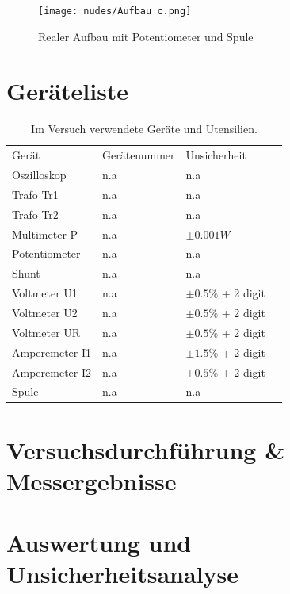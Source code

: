 \documentclass[12pt,a4paper,twoside]{article}
\begin{document}
\begin{figure}[H]
    \centering
    \texttt{[image: nudes/Aufbau c.png]}
    \caption{Realer Aufbau mit Potentiometer und Spule}
    \label{fig:RealerAufbauB}
\end{figure}



\section{Geräteliste} %

    \begin{table}[H]
        \centering
        \caption{Im Versuch verwendete Geräte und Utensilien.}
        \label{tab:geraete}
        \begin{tabular}{| l | l | l | l |}
            \hline
            Gerät & Gerätenummer  & Unsicherheit \\
            Oszilloskop & {n.a} & {n.a} \\
            Trafo Tr1 & {n.a} & {n.a} \\
            Trafo Tr2 & {n.a} & {n.a} \\
            Multimeter P & {n.a} & $\pm 0.001 W$ \\
            Potentiometer & {n.a} & {n.a} \\
            Shunt & {n.a} & {n.a} \\
            Voltmeter U1 & {n.a} & $\pm 0.5\%$ + 2 digit \\
            Voltmeter U2 & {n.a} & $\pm 0.5\%$ + 2 digit \\
            Voltmeter UR & {n.a} & $\pm 0.5\%$ + 2 digit \\
            Amperemeter I1 & {n.a} & $\pm 1.5\%$ + 2 digit \\
            Amperemeter I2 & {n.a} & $\pm 0.5\%$ + 2 digit \\
            Spule & {n.a} & {n.a} \\
            \hline
        \end{tabular}
    \end{table}


\section{Versuchsdurchführung \& Messergebnisse} %


\section{Auswertung und Unsicherheitsanalyse} %
\end{document}
